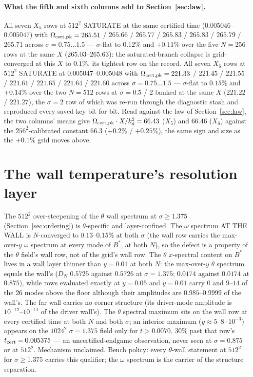 \documentclass[11pt,a4paper]{article}
\newcommand{\kd}{k_d}
\newcommand{\Om}{\Omega_{\rm cert,pk}}
\newcommand{\tcert}{t_{\rm cert}}
\newcommand{\Bst}{B^*}
\begin{document}
\paragraph{What the fifth and sixth columns add to Section~\ref{sec:law}.} All seven $X_5$ rows at $512^2$ SATURATE at the same certified time ($0.005046$--$0.005047$) with $\Om=265.51$ / $265.66$ / $265.77$ / $265.83$ / $265.83$ / $265.79$ / $265.71$ across $\sigma=0.75\dots1.5$ --- $\sigma$-flat to $0.12\%$ and $+0.11\%$ over the five $N=256$ rows at the same $X$ ($265.03$--$265.63$): the saturated-branch collapse is grid-converged at this $X$ to $0.1\%$, its tightest row on the record. All seven $X_6$ rows at $512^2$ SATURATE at $0.005047$--$0.005048$ with $\Om=221.33$ / $221.45$ / $221.55$ / $221.61$ / $221.65$ / $221.64$ / $221.60$ across $\sigma=0.75\dots1.5$ --- $\sigma$-flat to $0.15\%$ and $+0.14\%$ over the two $N=512$ rows at $\sigma=0.5$ / $2$ banked at the same $X$ ($221.22$ / $221.27$), the $\sigma=2$ row of which was re-run through the diagnostic stash and reproduced every saved key bit for bit. Read against the law of Section~\ref{sec:law}, the two columns' means give $\Om\cdot X/\kd^2=66.43$ ($X_5$) and $66.46$ ($X_6$) against the $256^2$-calibrated constant $66.3$ ($+0.2\%$ / $+0.25\%$), the same sign and size as the $+0.1\%$ grid moves above.

\section{The wall temperature's resolution layer}\label{sec:layer}

The $512^2$ over-steepening of the $\theta$ wall spectrum at $\sigma\ge1.375$ (Section~\ref{sec:ordering}) is $\theta$-specific and layer-confined. The $\omega$ spectrum AT THE WALL is $N$-converged to $0.13$--$0.15\%$ at both $\sigma$ (the wall row carries the max-over-$y$ $\omega$ spectrum at every mode of $\Bst$, at both $N$), so the defect is a property of the $\theta$ field's wall row, not of the grid's wall row. The $\theta$ $x$-spectral content on $\Bst$ lives in a wall layer thinner than $y=0.01$ at both $N$: the max-over-$y$ $\theta$ spectrum equals the wall's ($D_N$ $0.5725$ against $0.5726$ at $\sigma=1.375$; $0.0174$ against $0.0174$ at $0.875$), while rows evaluated exactly at $y=0.05$ and $y=0.01$ carry $0$ and $9$--$14$ of the $26$ modes above the floor although their amplitudes are $0.985$--$0.9999$ of the wall's. The far wall carries no corner structure (its driver-mode amplitude is $10^{-12}$--$10^{-11}$ of the driver wall's). The $\theta$ spectral maximum sits on the wall row at every certified time at both $N$ and both $\sigma$; an interior maximum ($y\approx5$--$8\cdot10^{-3}$) appears on the $1024^2$ $\sigma=1.375$ field only for $t>0.0070$, $30\%$ past that row's $\tcert=0.005375$ --- an uncertified-endgame observation, never seen at $\sigma=0.875$ or at $512^2$. Mechanism unclaimed. Bench policy: every $\theta$-wall statement at $512^2$ for $\sigma\ge1.375$ carries this qualifier; the $\omega$ spectrum is the carrier of the structure separation.
\end{document}
